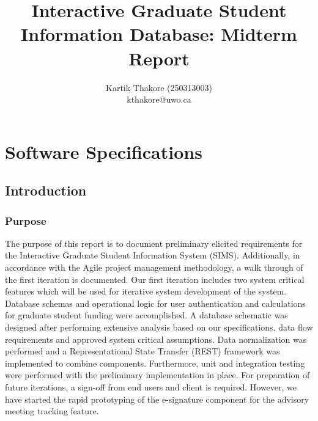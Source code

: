 \documentclass[11pt,a4paper]{report}
\begin{document}
\title{Interactive Graduate Student Information Database: Midterm Report} 
\author{Kartik Thakore (250313003)\\kthakore@uwo.ca}
\maketitle

\tableofcontents
\clearpage
\newpage
\chapter{Software Specifications}
\section{Introduction}
\subsection{Purpose}
The purpose of this report is to document preliminary elicited requirements for the Interactive Graduate Student Information System (SIMS). Additionally, in accordance with the Agile project management
methodology, a walk through of the first iteration is documented. Our first iteration includes two system
critical features which will be used for iterative system development of the system. Database schemas and
operational logic for user authentication and calculations for graduate student funding were accomplished.
A database schematic was designed after performing extensive analysis based on our specifications, data flow
requirements and approved system critical assumptions. Data normalization was performed and a Representational State Transfer (REST) framework was implemented to combine components. Furthermore, unit and
integration testing were performed with the preliminary implementation in place. For preparation of future
iterations, a sign-off from end users and client is required. However, we have started the rapid prototyping
of the e-signature component for the advisory meeting tracking feature.
\end{document}
